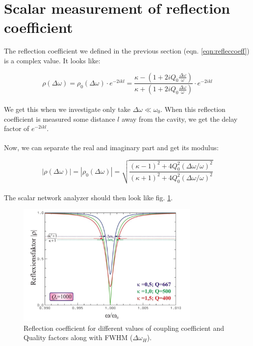\documentclass[a4paper]{article}
\numberwithin{equation}{section}
\begin{document}
\section{Scalar measurement of reflection coefficient}
The reflection coefficient we defined in the previous section (eqn. \ref{eqn:refleccoeff}) is a complex value. It looks like:

\[
		\rho(\Delta \omega) = \rho_{0} (\Delta \omega) \cdot e^{-2ikl} = \frac{\kappa - \left(1 + 2iQ_{0}\frac{\Delta \omega}{\omega}\right)}{\kappa + \left(1 + 2iQ_{0}\frac{\Delta \omega}{\omega}\right)} \cdot e^{-2ikl}
\]
\\
We get this when we investigate only take $\Delta \omega \ll \omega_{0}$. When this reflection coefficient is measured some distance $l$ away from the cavity, we get the delay factor of $e^{-2ikl}$.
\\ \\
Now, we can separate the real and imaginary part and get its modulus: 

\begin{equation} \label{eqn:scalar}
			\left| \rho (\Delta \omega) \right| = \left| \rho_{0}(\Delta \omega) \right| = \sqrt{\frac{(\kappa - 1)^2 + 4Q_{0}^2 \left(\Delta \omega / \omega \right)^2}{(\kappa + 1)^2 + 4Q_{0}^2 \left(\Delta \omega / \omega \right)^2}} 
\end{equation}
\\
The scalar network analyzer should then look like fig. \ref{fig:scalar}.

\begin{figure}[hbt!]
    \centering
    \includegraphics[width=0.8\textwidth]{scalar}
	\caption{Reflection coefficient for different values of coupling coefficient and Quality factors along with FWHM ($\Delta \omega_{H}$). \cite{Switka22}}
    \label{fig:scalar}
\end{figure}
\end{document}
